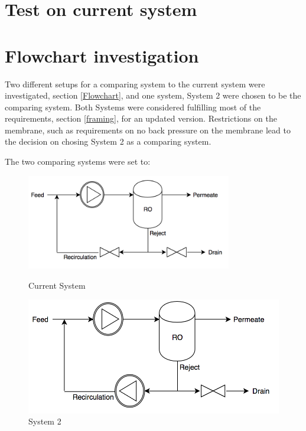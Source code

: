 
\section{Test on current system}

\section{Flowchart investigation}
Two different setups for a comparing system to the current system were investigated, section \ref{Flowchart}, and one system, System 2 were chosen to be the comparing system. Both Systems were considered fulfilling most of the requirements, section \ref{framing}, for an updated version. Restrictions on the membrane, such as requirements on no back pressure on the membrane lead to the decision on chosing System 2 as a comparing system. 

The two comparing systems were set to:\\
\begin{figure}[h]
\centering
\begin{minipage}{.5\textwidth}
    \centering
    \includegraphics[width=0.8\textwidth]{Sys1}
    \caption{Current System}
    \label{fig:System1}
\end{minipage}%
\begin{minipage}{.5\textwidth}
  \centering
  \includegraphics[width=.8\linewidth]{Sys2}
  \caption{System 2}
  \label{fig:System2}
\end{minipage}
\end{figure}


